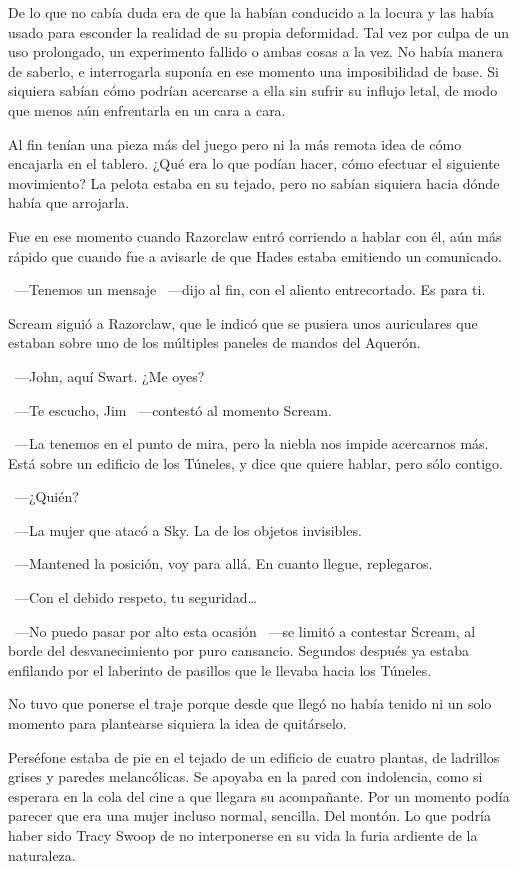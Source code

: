 De lo que no cabía duda era de que la habían conducido a la locura y las había usado para esconder la realidad de su propia deformidad. Tal vez por culpa de un uso prolongado, un experimento fallido o ambas cosas a la vez. No había manera de saberlo, e interrogarla suponía en ese momento una imposibilidad de base. Si siquiera sabían cómo podrían acercarse a ella sin sufrir su influjo letal, de modo que menos aún enfrentarla en un cara a cara.

Al fin tenían una pieza más del juego pero ni la más remota idea de cómo encajarla en el tablero. ¿Qué era lo que podían hacer, cómo efectuar el siguiente movimiento? La pelota estaba en su tejado, pero no sabían siquiera hacia dónde había que arrojarla.

Fue en ese momento cuando Razorclaw entró corriendo a hablar con él, aún más rápido que cuando fue a avisarle de que Hades estaba emitiendo un comunicado.

~---Tenemos un mensaje ~---dijo al fin, con el aliento entrecortado. Es para ti.

Scream siguió a Razorclaw, que le indicó que se pusiera unos auriculares que estaban sobre uno de los múltiples paneles de mandos del Aquerón.

~---John, aquí Swart. ¿Me oyes?

~---Te escucho, Jim ~---contestó al momento Scream.

~---La tenemos en el punto de mira, pero la niebla nos impide acercarnos más. Está sobre un edificio de los Túneles, y dice que quiere hablar, pero sólo contigo.

~---¿Quién?

~---La mujer que atacó a Sky. La de los objetos invisibles.

~---Mantened la posición, voy para allá. En cuanto llegue, replegaros.

~---Con el debido respeto, tu seguridad\dots

~---No puedo pasar por alto esta ocasión ~---se limitó a contestar Scream, al borde del desvanecimiento por puro cansancio. Segundos después ya estaba enfilando por el laberinto de pasillos que le llevaba hacia los Túneles.

No tuvo que ponerse el traje porque desde que llegó no había tenido ni un solo momento para plantearse siquiera la idea de quitárselo.

\parbreak
Perséfone estaba de pie en el tejado de un edificio de cuatro plantas, de ladrillos grises y paredes melancólicas. Se apoyaba en la pared con indolencia, como si esperara en la cola del cine a que llegara su acompañante. Por un momento podía parecer que era una mujer incluso normal, sencilla. Del montón. Lo que podría haber sido Tracy Swoop de no interponerse en su vida la furia ardiente de la naturaleza.

